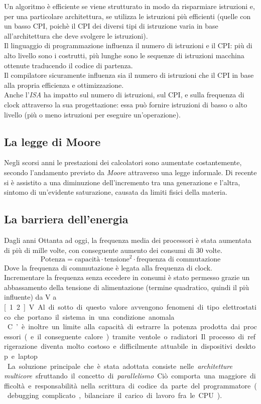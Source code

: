 \documentclass[class=book, crop=false]{standalone}
\begin{document}
Un algoritmo è efficiente se viene strutturato in modo da risparmiare istruzioni e, per una particolare architettura, se utilizza le istruzioni più efficienti (quelle con un basso CPI, poichè il CPI dei diversi tipi di istruzione varia in base all'architettura che deve svolgere le istruzioni).\\
Il linguaggio di programmazione influenza il numero di istruzioni e il CPI: più di alto livello sono i costrutti, più lunghe sono le sequenze di istruzioni macchina ottenute traducendo il codice di partenza.\\
Il compilatore sicuramente influenza sia il numero di istruzioni che il CPI in base alla propria efficienza e ottimizzazione.\\
Anche l'\emph{ISA} ha impatto sul numero di istruzioni, sul CPI, e sulla frequenza di clock attraverso la sua progettazione: essa può fornire istruzioni di basso o alto livello (più o meno istruzioni per eseguire un'operazione).

\subsection{La legge di Moore}
Negli scorsi anni le prestazioni dei calcolatori sono aumentate costantemente, secondo l'andamento previsto da \emph{Moore} attraverso una legge informale. Di recente si è assistito a una diminuzione dell’incremento tra una generazione e l’altra, sintomo di un'evidente saturazione, causata da limiti fisici della materia.

\subsection{La barriera dell'energia}
Dagli anni Ottanta ad oggi, la frequenza media dei processori è stata aumentata di più di mille volte, con conseguente aumento dei consumi di 30 volte.
\begin{equation*}
\text{Potenza} = \text{capacità}\cdot \text{tensione}^2\cdot \text{frequenza di commutazione}
\end{equation*}
Dove la frequenza di commutazione è legata alla frequenza di clock.\\
Incrementare la frequenza senza eccedere in consumi è stato permesso grazie un abbassamento della tensione di alimentazione (termine quadratico, quindi il più influente) da \unit[5]{V} a \unit[1.2]{V}. Al di sotto di questo valore avvengono fenomeni di tipo elettrostatico che portano il sistema in una condizione anomala.\\
C’è inoltre un limite alla capacità di estrarre la potenza prodotta dai processori (e il conseguente calore) tramite ventole o radiatori. Il processo di refrigerazione diventa molto costoso e difficilmente attuabile in dispositivi desktop e laptop.\\
La soluzione principale che è stata adottata consiste nelle \emph{architetture multicore} sfruttando il concetto di \emph{parallelismo}. Ciò comporta una maggiore difficoltà e responsabilità nella scrittura di codice da parte del programmatore (debugging complicato, bilanciare il carico di lavoro fra le CPU).
\end{document}
